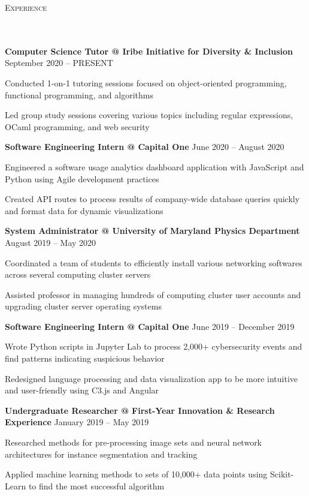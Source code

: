 \documentclass{article}
\newcommand{\header}[1]{{
\hspace*{-15pt}\vspace*{6pt} \large \scshape{#1}} \vspace*{-6pt} 
\lineunder
}
\newcommand{\lineunder}{
\vspace*{-8pt} \\ \hspace*{-18pt} 
\hrulefill \\
}
\newcommand{\employer}[4]{{
\vspace*{2pt}%
\textbf{#1} #2 \hfill #3\\ #4 \vspace*{2pt}}
}
\renewcommand{\labelitemii}{
$\vcenter{\hbox{\tiny$\bullet$}}$\hspace*{-3pt}
}
\newenvironment{bullet-list-minor}{
\begin{list}{\labelitemii}{\setlength\leftmargin{15pt} 
\topsep 0pt \itemsep -2pt}}{\vspace*{4pt}\end{list}
}
\begin{document}
\vspace*{4pt}%
\header{Experience}
    \vspace{4pt}
    \employer{Computer Science Tutor @ Iribe Initiative for Diversity \& Inclusion}{}{September 2020 -- PRESENT}{}
	\begin{bullet-list-minor}
	\item Conducted 1-on-1 tutoring sessions focused on object-oriented programming, functional programming, and algorithms
    \item Led group study sessions covering various topics including regular expressions, OCaml programming, and web security
    \end{bullet-list-minor}
    \smallskip
    \employer{Software Engineering Intern @ Capital One}{}{June 2020 -- August 2020}{}
	\begin{bullet-list-minor}
	\item Engineered a software usage analytics dashboard application with JavaScript and Python using Agile development practices
	\item Created API routes to process results of company-wide database queries quickly and format data for dynamic visualizations
    \end{bullet-list-minor}
    \smallskip
    \employer{System Administrator @ University of Maryland Physics Department}{}{August 2019 -- May 2020}{}
	\begin{bullet-list-minor}
	\item Coordinated a team of students to efficiently install various networking softwares across several computing cluster servers
	\item Assisted professor in managing hundreds of computing cluster user accounts and upgrading cluster server operating systems
    \end{bullet-list-minor}
    \smallskip  
    \employer{Software Engineering Intern @ Capital One}{}{June 2019 -- December 2019}{}
	\begin{bullet-list-minor}
	\item Wrote Python scripts in Jupyter Lab to process 2,000+  cybersecurity events and find patterns indicating suspicious behavior
	\item Redesigned language processing and data visualization app to be more intuitive and user-friendly using C3.js and Angular
    \end{bullet-list-minor}
    \smallskip    
    \employer{Undergraduate Researcher @ First-Year Innovation \& Research Experience}{}{January 2019 -- May 2019}{}
	\begin{bullet-list-minor}
	\item Researched methods for pre-processing image sets and neural network architectures for instance segmentation and tracking
	\item Applied machine learning methods to sets of 10,000+ data points using Scikit-Learn to find the most successful algorithm
    \end{bullet-list-minor}
\end{document}
